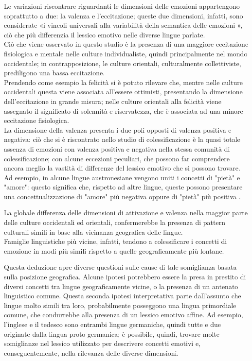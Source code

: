 Le variazioni riscontrare riguardanti le dimensioni delle emozioni appartengono soprattutto a due: la valenza e l'eccitazione; queste due dimensioni, infatti, sono considerate «i vincoli universali alla variabilità della semantica delle emozioni \parencite{jackson_joshua}», ciò che più differenzia il lessico emotivo nelle diverse lingue parlate. \\
Ciò che viene osservato in questo studio è la presenza di una maggiore eccitazione fisiologica e mentale nelle culture individualiste, quindi principalmente nel mondo occidentale; in contrapposizione, le culture orientali, culturalmente collettiviste, prediligono una bassa eccitazione. \\ 
Prendendo come esempio la felicità si è potuto rilevare che, mentre nelle culture occidentali questa viene associata all'essere ottimisti, presentando la dimensione dell'eccitazione in grande misura; nelle culture orientali alla felicità viene assegnato il significato di solennità e riservatezza, che è associata ad una minore eccitazione fisiologica. \\
La dimensione della valenza presenta i due poli opposti di valenza positiva e negativa: ciò che si è riscontrato nello studio di colessificazione è la quasi totale assenza di emozioni con valenza positiva e negativa nella stessa comunità di colessificazione; con alcune eccezioni peculiari, che possono far comprendere ancora meglio la vastità di differenze del lessico emotivo che si possono trovare. \\
Ad esempio, in alcune lingue austronesiane vengono uniti i concetti di "pietà" e "amore": questo significa che, rispetto ad altre lingue, queste possono presentare una concettualizzazione di "amore" più negativa oppure di "pietà" più positiva \parencite{jackson_joshua}.

La globale differenza delle dimensioni di attivazione e valenza nella maggior parte delle culture occidentali ed orientali, confermerebbe la presenza di pattern culturali simili in base alla vicinanza geografica delle lingue.\\ Famiglie linguistiche più vicine, infatti, tendono a colessificare i concetti di emozione in modi più simili rispetto a quelle geograficamente più lontane.

Questa deduzione apre diverse questioni sulle cause di tale somiglianza basata sulla posizione geografica. Alcune ipotesi potrebbero essere la presa in prestito di diversi concetti tra lingue geograficamente vicine, o la presenza di un antenato linguistico comune. Questa seconda ipotesi interpretativa parte dall'assunto che lingue molto simili tra loro, probabilmente posseggono una lingua primordiale comune, che condurrebbe alla presenza di un lessico emotivo affine. Ad esempio, l'inglese e il tedesco sono entrambi lingue germaniche, quindi tutte e due originate dalla lingua proto-germanica; è possibile, quindi, trovare molte somiglianze nel lessico utilizzato per descrivere concetti emotivi e, conseguentemente, nella rilevanza delle diverse dimensioni. 

